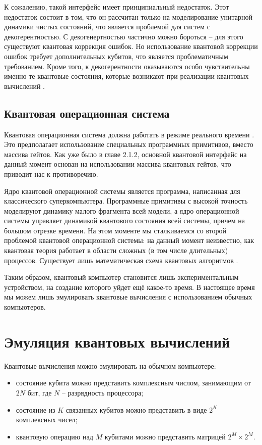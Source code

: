 К сожалению, такой интерфейс имеет принципиальный недостаток. Этот недостаток состоит в том, что он рассчитан только на моделирование унитарной динамики чистых состояний, что является проблемой для систем с декогерентностью. С декогенертностью частично можно бороться \cite{quantum-codes} -- для этого существуют квантовая коррекция ошибок. Но использование квантовой коррекции ошибок требует дополнительных кубитов, что является проблематичным требованием. Кроме того, к декогерентности оказываются особо чувствительны именно те квантовые состояния, которые возникают при реализации квантовых вычислений \cite{quantum-computer}.

\subsection{Квантовая операционная система}

Квантовая операционная система должна работать в режиме реального времени \cite{quantum-computer}. Это предполагает использование специальных программных примитивов, вместо массива гейтов. Как уже было в главе 2.1.2, основной квантовой интерфейс на данный момент основан на использовании массива квантовых гейтов, что приводит нас к противоречию. 

Ядро квантовой операционной системы является программа, написанная для классического суперкомпьютера. Программные примитивы с высокой точность моделируют динамику малого фрагмента всей модели, а ядро операционной системы управляет динамикой квантового состояния всей системы, причем на большом отрезке времени. На этом моменте мы сталкиваемся со второй проблемой квантовой операционной системы: на данный момент неизвестно, как квантовая теория работает в области сложных (в том числе длительных) процессов. Существует лишь математическая схема квантовых алгоритмов \cite{quantum-computer}.

Таким образом, квантовый компьютер становится лишь экспериментальным устройством, на создание которого уйдет ещё какое-то время. В настоящее время мы можем лишь эмулировать квантовые вычисления с использованием обычных компьютеров.

\section{Эмуляция квантовых вычислений}

Квантовые вычисления можно эмулировать на обычном компьютере:

\begin{itemize}
	\item состояние кубита можно представить комплексным числом, занимающим от $2N$ бит, где $N$ -- разрядность процессора;
	\item состояние из $K$ связанных кубитов можно представить в виде $2^K$ комплексных чисел;
	\item квантовую операцию над $M$ кубитами можно представить матрицей $2^M \times 2^M$.
\end{itemize}

